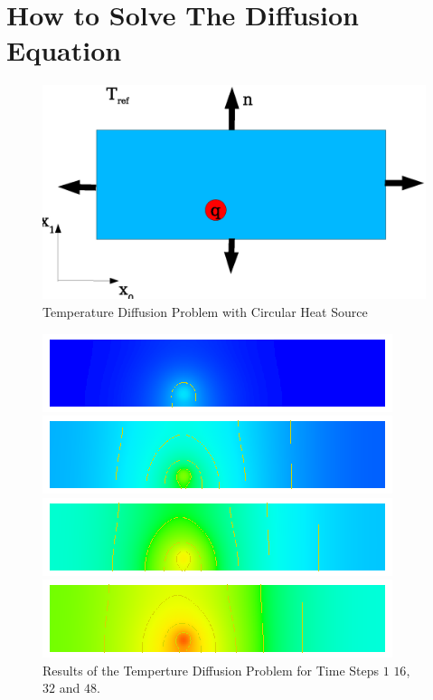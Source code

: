 \chapter{How to Solve The Diffusion Equation}
\label{DIFFUSION CHAP}

\begin{figure}
\centerline{\includegraphics[width=\figwidth]{DiffusionDomain}}
\caption{Temperature Diffusion Problem with Circular Heat Source}
\label{DIFFUSION FIG 1}
\end{figure}

\begin{figure}
\centerline{\includegraphics[width=\figwidth]{DiffusionRes1}}
\centerline{\includegraphics[width=\figwidth]{DiffusionRes16}}
\centerline{\includegraphics[width=\figwidth]{DiffusionRes32}}
\centerline{\includegraphics[width=\figwidth]{DiffusionRes48}}
\caption{Results of the Temperture Diffusion Problem for Time Steps $1$ $16$, $32$ and $48$.}
\label{DIFFUSION FIG 2}
\end{figure}


